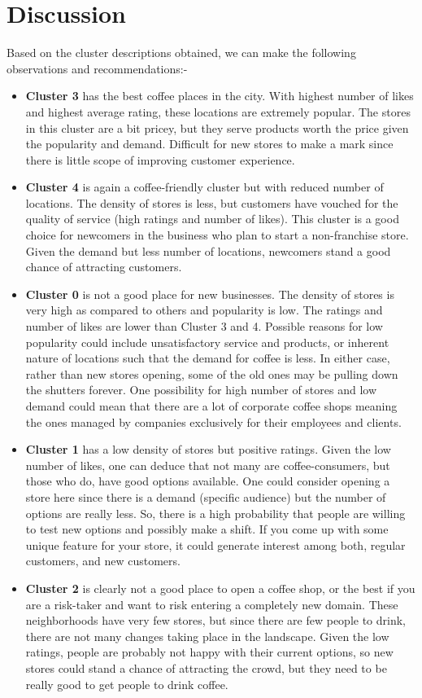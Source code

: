 \documentclass{article}
\begin{document}
\section{Discussion}
{Based on the cluster descriptions obtained, we can make the following observations and recommendations:-}
\begin{itemize}
    \item \textbf{Cluster 3} has the best coffee places in the city. With highest number of likes and highest average rating, these locations are extremely popular. The stores in this cluster are a bit pricey, but they serve products worth the price given the popularity and demand. Difficult for new stores to make a mark since there is little scope of improving customer experience.
    \item \textbf{Cluster 4} is again a coffee-friendly cluster but with reduced number of locations. The density of stores is less, but customers have vouched for the quality of service (high ratings and number of likes). This cluster is a good choice for newcomers in the business who plan to start a non-franchise store. Given the demand but less number of locations, newcomers stand a good chance of attracting customers.
    \item \textbf{Cluster 0} is not a good place for new businesses. The density of stores is very high as compared to others and popularity is low. The ratings and number of likes are lower than Cluster 3 and 4. Possible reasons for low popularity could include unsatisfactory service and products, or inherent nature of locations such that the demand for coffee is less. In either case, rather than new stores opening, some of the old ones may be pulling down the shutters forever. One possibility for high number of stores and low demand could mean that there are a lot of corporate coffee shops meaning the ones managed by companies exclusively for their employees and clients. 
    \item \textbf{Cluster 1} has a low density of stores but positive ratings. Given the low number of likes, one can deduce that not many are coffee-consumers, but those who do, have good options available. One could consider opening a store here since there is a demand (specific audience) but the number of options are really less. So, there is a high probability that people are willing to test new options and possibly make a shift. If you come up with some unique feature for your store, it could generate interest among both, regular customers, and new customers.
    \item \textbf{Cluster 2} is clearly not a good place to open a coffee shop, or the best if you are a risk-taker and want to risk entering a completely new domain. These neighborhoods have very few stores, but since there are few people to drink, there are not many changes taking place in the landscape. Given the low ratings, people are probably not happy with their current options, so new stores could stand a chance of attracting the crowd, but they need to be really good to get people to drink coffee.
\end{itemize}
\pagebreak
\end{document}

